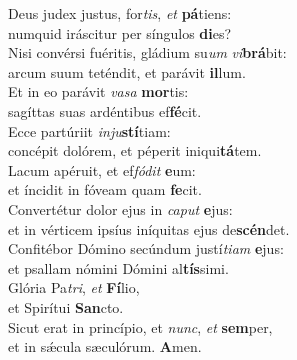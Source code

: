 \evenverse Deus judex justus, for\textit{tis}, \textit{et} \textbf{pá}tiens:~\*\\
\evenverse numquid iráscitur per síngulos \textbf{di}es?\\
\oddverse Nisi convérsi fuéritis, gládium su\textit{um} \textit{vi}\textbf{brá}bit:~\*\\
\oddverse arcum suum teténdit, et parávit \textbf{il}lum.\\
\evenverse Et in eo parávit \textit{va}\textit{sa} \textbf{mor}tis:~\*\\
\evenverse sagíttas suas ardéntibus ef\textbf{fé}cit.\\
\oddverse Ecce partúriit \textit{in}\textit{ju}\textbf{stí}tiam:~\*\\
\oddverse concépit dolórem, et péperit iniqui\textbf{tá}tem.\\
\evenverse Lacum apéruit, et ef\textit{fó}\textit{dit} \textbf{e}um:~\*\\
\evenverse et íncidit in fóveam quam \textbf{fe}cit.\\
\oddverse Convertétur dolor ejus in \textit{ca}\textit{put} \textbf{e}jus:~\*\\
\oddverse et in vérticem ipsíus iníquitas ejus de\textbf{scén}det.\\
\evenverse Confitébor Dómino secúndum justí\textit{ti}\textit{am} \textbf{e}jus:~\*\\
\evenverse et psallam nómini Dómini al\textbf{tís}simi.\\
\oddverse Glória Pa\textit{tri}, \textit{et} \textbf{Fí}lio,~\*\\
\oddverse et Spirítui \textbf{San}cto.\\
\evenverse Sicut erat in princípio, et \textit{nunc}, \textit{et} \textbf{sem}per,~\*\\
\evenverse et in sǽcula sæculórum. \textbf{A}men.\\

